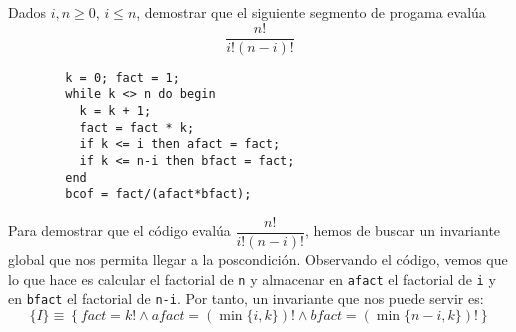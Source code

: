 \begin{ejercicio}
    Dados $i,n\geq 0$, $i\leq n$, demostrar que el siguiente segmento de progama evalúa
    \begin{equation*}
        \dfrac{n!}{i!(n-i)!}
    \end{equation*}
    \begin{verbatim}
        k = 0; fact = 1;
        while k <> n do begin
          k = k + 1;
          fact = fact * k;
          if k <= i then afact = fact;
          if k <= n-i then bfact = fact;
        end
        bcof = fact/(afact*bfact);
    \end{verbatim}


    Para demostrar que el código evalúa $\dfrac{n!}{i!(n-i)!}$, hemos de buscar un invariante global que nos permita llegar a la poscondición. Observando el código, vemos que lo que hace es calcular el factorial de \verb|n| y almacenar en \verb|afact| el factorial de \verb|i| y en \verb|bfact| el factorial de \verb|n-i|. Por tanto, un invariante que nos puede servir es:
    \begin{equation*}
        \{I\} \equiv \left\{fact = k! \land afact = (\min\{i,k\})! \land bfact = (\min\{n-i,k\})!\right\}
    \end{equation*}


\end{ejercicio}
